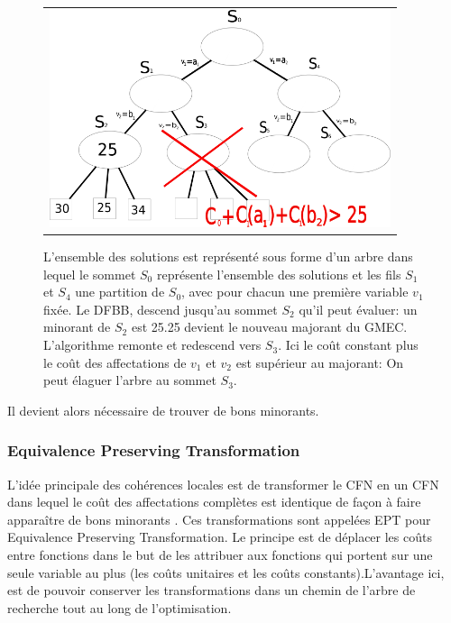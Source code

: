 \begin{figure}[!htbp]
  \centering
  \begin{tabular}{c}
    \includegraphics[width=10cm]{figure/DFBB.png} \\
  \end{tabular}
  \caption{ L'ensemble des solutions est représenté sous forme d'un arbre dans lequel le sommet $S_0$ représente l'ensemble des solutions et les fils $S_1$ et $S_4$ une partition de $S_0$, avec pour chacun une première variable $v_1$ fixée. Le DFBB, descend jusqu'au sommet $S_2$ qu'il peut évaluer: un minorant de $S_2$ est 25.25 devient le nouveau majorant du GMEC. L'algorithme remonte et redescend vers $S_3$. Ici le coût constant plus le coût des affectations de $v_1$ et $v_2$ est supérieur au majorant: On peut élaguer l'arbre au sommet $S_3$.}
  \label{fig:DFBB}
\end{figure}



Il devient alors nécessaire de trouver de bons minorants.

\subsubsection{Equivalence Preserving Transformation}

L'idée principale des cohérences locales est de transformer le CFN en un CFN dans lequel le coût des affectations complètes est identique de façon à faire apparaître de bons minorants \cite{Schiex00}. Ces transformations sont appelées EPT pour \og Equivalence Preserving Transformation\fg.  Le principe est de déplacer les coûts entre fonctions dans le but de les attribuer aux fonctions qui portent sur une seule variable au plus (les coûts unitaires et les coûts constants).L'avantage ici, est de pouvoir conserver les transformations dans un chemin de l'arbre de recherche tout au long de l'optimisation.

